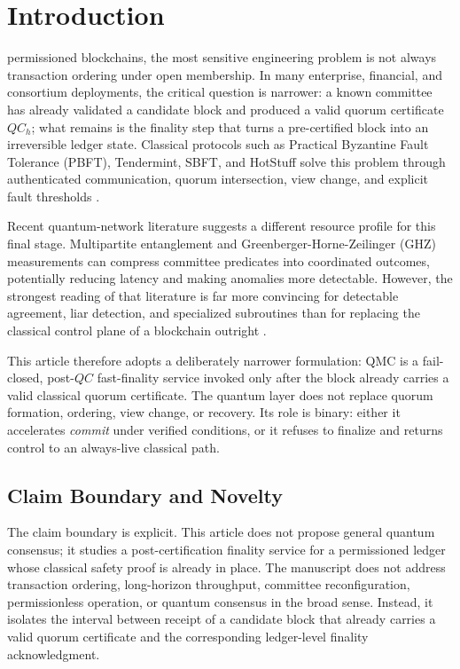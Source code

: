 \documentclass{ieeeaccess}
\begin{document}
\titlepgskip=-15pt
\maketitle

\section{Introduction}
\label{sec:introduction}
 permissioned blockchains, the most sensitive engineering problem is not always transaction ordering under open membership. In many enterprise, financial, and consortium deployments, the critical question is narrower: a known committee has already validated a candidate block and produced a valid quorum certificate $QC_h$; what remains is the finality step that turns a pre-certified block into an irreversible ledger state. Classical protocols such as Practical Byzantine Fault Tolerance (PBFT), Tendermint, SBFT, and HotStuff solve this problem through authenticated communication, quorum intersection, view change, and explicit fault thresholds \cite{b1,b2,b3,b4,b5,b6}.

Recent quantum-network literature suggests a different resource profile for this final stage. Multipartite entanglement and Greenberger-Horne-Zeilinger (GHZ) measurements can compress committee predicates into coordinated outcomes, potentially reducing latency and making anomalies more detectable. However, the strongest reading of that literature is far more convincing for detectable agreement, liar detection, and specialized subroutines than for replacing the classical control plane of a blockchain outright \cite{b7,b8,b9,b10,b11,b12}.

This article therefore adopts a deliberately narrower formulation: QMC is a fail-closed, post-$QC$ fast-finality service invoked only after the block already carries a valid classical quorum certificate. The quantum layer does not replace quorum formation, ordering, view change, or recovery. Its role is binary: either it accelerates \textit{commit} under verified conditions, or it refuses to finalize and returns control to an always-live classical path.

\subsection{Claim Boundary and Novelty}
The claim boundary is explicit. This article does not propose general quantum consensus; it studies a post-certification finality service for a permissioned ledger whose classical safety proof is already in place. The manuscript does not address transaction ordering, long-horizon throughput, committee reconfiguration, permissionless operation, or quantum consensus in the broad sense. Instead, it isolates the interval between receipt of a candidate block that already carries a valid quorum certificate and the corresponding ledger-level finality acknowledgment.
\end{document}
